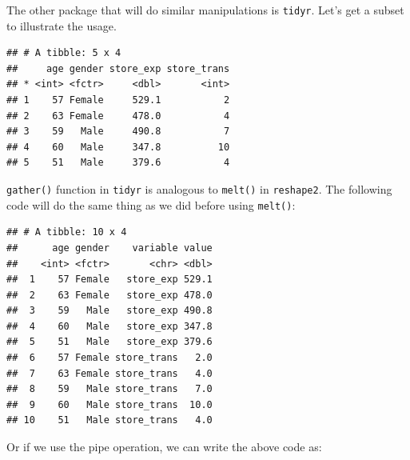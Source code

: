 \documentclass[12pt,]{krantz}
\newenvironment{Shaded}{\begin{snugshade}}{\end{snugshade}}
\newcommand{\KeywordTok}[1]{\textcolor[rgb]{0.13,0.29,0.53}{\textbf{{#1}}}}
\newcommand{\DecValTok}[1]{\textcolor[rgb]{0.00,0.00,0.81}{{#1}}}
\newcommand{\StringTok}[1]{\textcolor[rgb]{0.31,0.60,0.02}{{#1}}}
\newcommand{\CommentTok}[1]{\textcolor[rgb]{0.56,0.35,0.01}{\textit{{#1}}}}
\newcommand{\NormalTok}[1]{{#1}}
\theoremstyle{definition}
\theoremstyle{definition}
\theoremstyle{remark}
\begin{document}
The other package that will do similar manipulations is \texttt{tidyr}.
Let's get a subset to illustrate the usage.

\begin{Shaded}
\end{Shaded}

\begin{verbatim}
## # A tibble: 5 x 4
##     age gender store_exp store_trans
## * <int> <fctr>     <dbl>       <int>
## 1    57 Female     529.1           2
## 2    63 Female     478.0           4
## 3    59   Male     490.8           7
## 4    60   Male     347.8          10
## 5    51   Male     379.6           4
\end{verbatim}

\texttt{gather()} function in \texttt{tidyr} is analogous to
\texttt{melt()} in \texttt{reshape2}. The following code will do the
same thing as we did before using \texttt{melt()}:

\begin{Shaded}
\end{Shaded}

\begin{verbatim}
## # A tibble: 10 x 4
##      age gender    variable value
##    <int> <fctr>       <chr> <dbl>
##  1    57 Female   store_exp 529.1
##  2    63 Female   store_exp 478.0
##  3    59   Male   store_exp 490.8
##  4    60   Male   store_exp 347.8
##  5    51   Male   store_exp 379.6
##  6    57 Female store_trans   2.0
##  7    63 Female store_trans   4.0
##  8    59   Male store_trans   7.0
##  9    60   Male store_trans  10.0
## 10    51   Male store_trans   4.0
\end{verbatim}

Or if we use the pipe operation, we can write the above code as:
\end{document}
